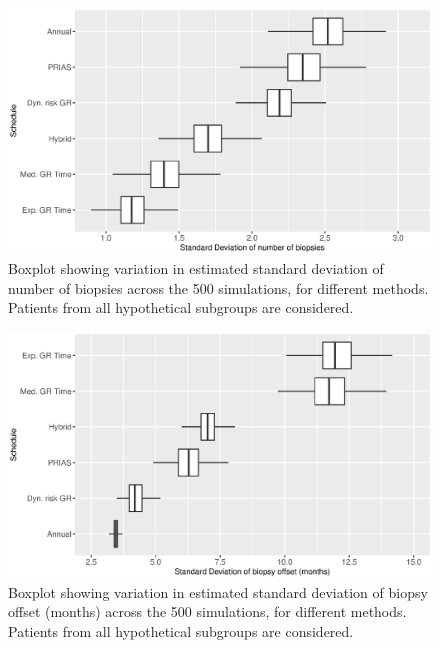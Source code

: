 \begin{figure}[!htb]
\centerline{\includegraphics[width=\columnwidth]{images/sim_study/nbSDBoxPlot_all.eps}}
\caption{Boxplot showing variation in estimated standard deviation of number of biopsies across the 500 simulations, for different methods. Patients from all hypothetical subgroups are considered.}
\label{fig : nbSDBoxPlot_all}
\end{figure}

\begin{figure}[!htb]
\centerline{\includegraphics[width=\columnwidth]{images/sim_study/offsetSDBoxPlot_all.eps}}
\caption{Boxplot showing variation in estimated standard deviation of biopsy offset (months) across the 500 simulations, for different methods. Patients from all hypothetical subgroups are considered.}
\label{fig : offsetSDBoxPlot_all}
\end{figure}



